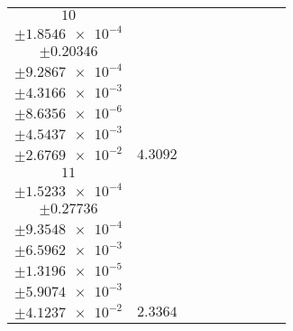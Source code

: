 \documentclass[8pt]{article}
\begin{document}
\begin{longtable}[l]{c c c c c c c c c}
$\num{10}$ & \begin{tabular}[c]{@{}c@{}}$\num{5.8831e-2}$ \\ $\pm\num{1.8546e-4}$\end{tabular} & \begin{tabular}[c]{@{}c@{}}$\num{0.13314}$ \\ $\pm\num{0.20346}$\end{tabular} & \begin{tabular}[c]{@{}c@{}}$\num{4.332}$ \\ $\pm\num{9.2867e-4}$\end{tabular} & \begin{tabular}[c]{@{}c@{}}$\num{3.5872e+3}$ \\ $\pm\num{4.3166e-3}$\end{tabular} & \begin{tabular}[c]{@{}c@{}}$\num{7.1764}$ \\ $\pm\num{8.6356e-6}$\end{tabular} & \begin{tabular}[c]{@{}c@{}}$\num{1.5861}$ \\ $\pm\num{4.5437e-3}$\end{tabular} & \begin{tabular}[c]{@{}c@{}}$\num{4.3913}$ \\ $\pm\num{2.6769e-2}$\end{tabular} & $\num{4.3092}$\\
$\num{11}$ & \begin{tabular}[c]{@{}c@{}}$\num{3.1421e-2}$ \\ $\pm\num{1.5233e-4}$\end{tabular} & \begin{tabular}[c]{@{}c@{}}$\num{0.19079}$ \\ $\pm\num{0.27736}$\end{tabular} & \begin{tabular}[c]{@{}c@{}}$\num{-8.2061}$ \\ $\pm\num{9.3548e-4}$\end{tabular} & \begin{tabular}[c]{@{}c@{}}$\num{3.6184e+3}$ \\ $\pm\num{6.5962e-3}$\end{tabular} & \begin{tabular}[c]{@{}c@{}}$\num{7.2389}$ \\ $\pm\num{1.3196e-5}$\end{tabular} & \begin{tabular}[c]{@{}c@{}}$\num{1.1859}$ \\ $\pm\num{5.9074e-3}$\end{tabular} & \begin{tabular}[c]{@{}c@{}}$\num{4.2319}$ \\ $\pm\num{4.1237e-2}$\end{tabular} & $\num{2.3364}$\\

\end{longtable}
\end{document}
